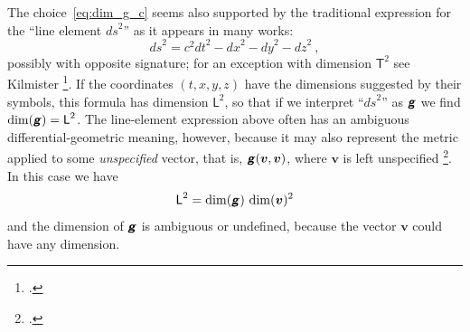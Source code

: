 \documentclass[\ifafour a4paper,12pt,\else a5paper,10pt,\fi%
onecolumn,oneside,article,%
british%
]{memoir}
\theoremstyle{remark}
\theoremstyle{innote}
\newcommand*{\mathte}[1]{\textbf{\textit{\textsf{#1}}}}
\newcommand*{\citep}{\footcites}
\renewcommand*{\|}[1][]{\nonscript\,#1\vert\nonscript\;\mathopen{}}
\newcommand*{\sect}{\S}%
\newcommand*{\chap}{ch.}%
\newcommand*{\cf}{{cf.}}
\newcommand*{\Le}{\textsf{L}}
\newcommand*{\Ti}{\textsf{T}}
\newcommand*{\yg}{\mathte{g}}
\newcommand*{\ygc}{\mathte{g}}
\newcommand*{\yv}{\bm{v}}
\newcommand*{\ds}{\mathit{ds}}
\begin{document}
The choice~\eqref{eq:dim_g_c} seems also supported by the traditional
expression for the \enquote{line element $\ds^{2}$} as it appears in many
works:
\begin{equation}
  \label{eq:line_elem}
  \ds^{2} = c^2\mathit{dt}^2 - \mathit{dx}^2 -\mathit{dy}^2 - \mathit{dz}^2
  \ ,
\end{equation}
possibly with opposite signature; for an exception with dimension $\Ti^{2}$
see Kilmister \citep[\chap~II p.~25]{kilmister1973}{kilmister1973}. If the
coordinates $(t,x,y,z)$ have the dimensions suggested by their symbols,
this formula has dimension $\Le^{2}$, so that if we interpret
\enquote{$\ds^{2}$} as $\ygc$ we find $\dim(\ygc) = \Le^{2}$. The
line-element expression above often has an ambiguous differential-geometric
meaning, however, because it may also represent the metric applied to some
\emph{unspecified} vector, that is, $\yg(\yv,\yv)$, where $\yv$ is left
unspecified \citep[\cf][Box~3.2~D p.~77]{misneretal1970_r1973}. In this
case we have
\begin{equation*}
  \label{eq:line_elem_dim_ambiguous}
  \Le^{2} = \dim(\yg)\,\dim(\yv)^{2}
\end{equation*}
and the dimension of $\yg$ is ambiguous or undefined, because the vector
$\yv$ could have any dimension.%

\medskip
\end{document}

